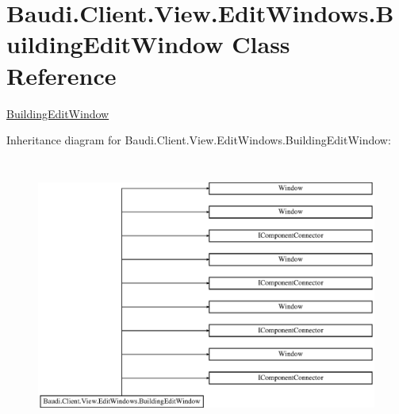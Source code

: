 \hypertarget{class_baudi_1_1_client_1_1_view_1_1_edit_windows_1_1_building_edit_window}{}\section{Baudi.\+Client.\+View.\+Edit\+Windows.\+Building\+Edit\+Window Class Reference}
\label{class_baudi_1_1_client_1_1_view_1_1_edit_windows_1_1_building_edit_window}


\hyperlink{class_baudi_1_1_client_1_1_view_1_1_edit_windows_1_1_building_edit_window}{Building\+Edit\+Window}  


Inheritance diagram for Baudi.\+Client.\+View.\+Edit\+Windows.\+Building\+Edit\+Window\+:\begin{figure}[H]
\begin{center}
\leavevmode
\includegraphics[height=9.061488cm]{class_baudi_1_1_client_1_1_view_1_1_edit_windows_1_1_building_edit_window}
\end{center}
\end{figure}
